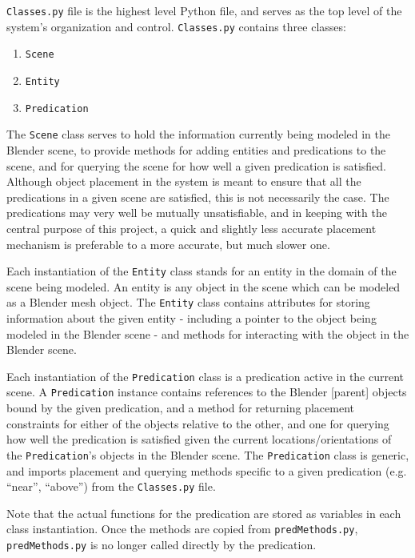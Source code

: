 \texttt{Classes.py} file is the highest level Python file, and serves as the top level of the system's organization and control. \texttt{Classes.py} contains three classes: 

\begin{enumerate}
	\item \texttt{Scene} 
	\item \texttt{Entity}
	\item \texttt{Predication} 
\end{enumerate}
	
The \texttt{Scene} class serves to hold the information currently being modeled in the Blender scene, to provide methods for adding entities and predications to the scene, and for querying the scene for how well a given predication is satisfied. 
Although object placement in the system is meant to ensure that all the predications in a given scene are satisfied, this is not necessarily the case. The predications may very well be mutually unsatisfiable, and in keeping with the central purpose of this project, a quick and slightly less accurate placement mechanism is preferable to a more accurate, but much slower one.

Each instantiation of the \texttt{Entity} class stands for an entity in the domain of the scene being modeled. 
An entity is any object in the scene which can be modeled as a Blender mesh object.
The \texttt{Entity} class contains attributes for storing information about the given entity - including a pointer to the object being modeled in the Blender scene - and methods for interacting with the object in the Blender scene.
	
Each instantiation of the \texttt{Predication} class is a predication active in the current scene. 
A \texttt{Predication} instance contains references to the Blender [parent] objects bound by the given predication, and a method for returning placement constraints for either of the objects relative to the other, and one for querying how well the predication is satisfied given the current locations/orientations of the \texttt{Predication}'s objects in the Blender scene. 
The \texttt{Predication} class is generic, and imports placement and querying methods specific to a given predication (e.g. ``near'', ``above'') from the \texttt{Classes.py} file. 

Note that the actual functions for the predication are stored as variables in each class instantiation. 
Once the methods are copied from \texttt{predMethods.py}, \texttt{predMethods.py} is no longer called directly by the predication.

